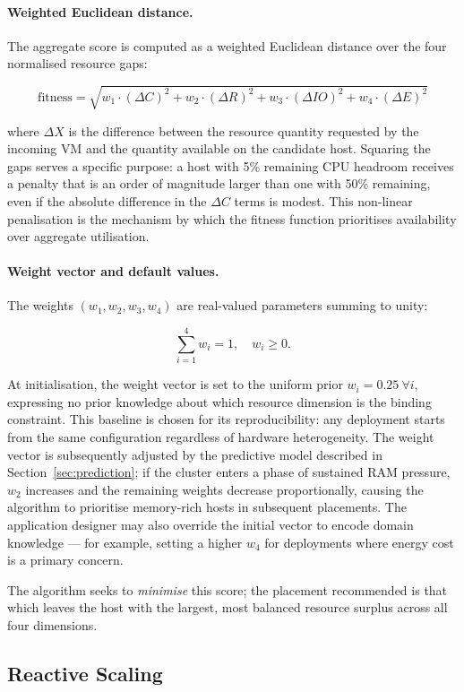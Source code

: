 \documentclass[12pt,a4paper]{report}
\begin{document}
\paragraph{Weighted Euclidean distance.}
The aggregate score is computed as a weighted Euclidean distance over the four
normalised resource gaps:

\[
  \text{fitness} =
    \sqrt{w_1 \cdot (\Delta C)^2 + w_2 \cdot (\Delta R)^2
        + w_3 \cdot (\Delta IO)^2 + w_4 \cdot (\Delta E)^2}
\]

where $\Delta X$ is the difference between the resource quantity requested by the
incoming VM and the quantity available on the candidate host. Squaring the gaps
serves a specific purpose: a host with 5\% remaining CPU headroom receives a penalty
that is an order of magnitude larger than one with 50\% remaining, even if the
absolute difference in the $\Delta C$ terms is modest. This non-linear penalisation
is the mechanism by which the fitness function prioritises availability over
aggregate utilisation.

\paragraph{Weight vector and default values.}
The weights $(w_1, w_2, w_3, w_4)$ are real-valued parameters summing to unity:

\[
  \sum_{i=1}^{4} w_i = 1, \quad w_i \geq 0.
\]

At initialisation, the weight vector is set to the uniform prior
$w_i = 0.25\ \forall i$, expressing no prior knowledge about which resource
dimension is the binding constraint. This baseline is chosen for its reproducibility:
any deployment starts from the same configuration regardless of hardware
heterogeneity. The weight vector is subsequently adjusted by the predictive model
described in Section~\ref{sec:prediction}; if the cluster enters a phase of sustained
RAM pressure, $w_2$ increases and the remaining weights decrease proportionally,
causing the algorithm to prioritise memory-rich hosts in subsequent placements. The
application designer may also override the initial vector to encode domain knowledge
--- for example, setting a higher $w_4$ for deployments where energy cost is a
primary concern.

The algorithm seeks to \textit{minimise} this score; the placement recommended is
that which leaves the host with the largest, most balanced resource surplus across
all four dimensions.

\subsection{Reactive Scaling}
\end{document}

